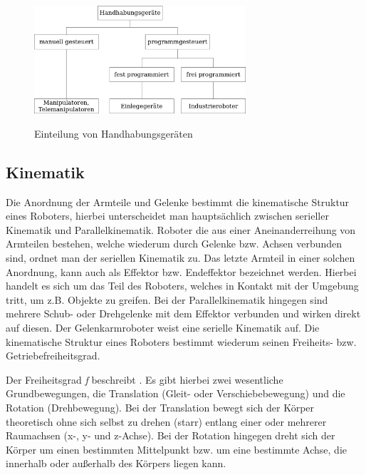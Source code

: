\documentclass[11pt,ngerman,parskip=half]{scrartcl}
\begin{document}
\begin{figure}[H]
  \centering
  \includegraphics[width=0.7\textwidth]{src/img/john2.png}
  \caption{Einteilung von Handhabungsgeräten}
  \label{img:john2}
  \parencite[][16]{weber_industrieroboter:_2017}
\end{figure}

\subsection{Kinematik}
\label{subsec:john_kinematik}
Die Anordnung der Armteile und Gelenke bestimmt die kinematische Struktur
eines Roboters, hierbei unterscheidet man hauptsächlich zwischen serieller
Kinematik und Parallelkinematik. Roboter die aus einer Aneinanderreihung von
Armteilen bestehen, welche wiederum durch Gelenke bzw. Achsen verbunden sind,
ordnet man der seriellen Kinematik zu. Das letzte Armteil in einer solchen
Anordnung, kann auch als Effektor bzw. Endeffektor bezeichnet werden. Hierbei
handelt es sich um das Teil des Roboters, welches in Kontakt mit der Umgebung
tritt, um z.B. Objekte zu greifen. Bei der Parallelkinematik hingegen sind
mehrere Schub- oder Drehgelenke mit dem Effektor verbunden und wirken direkt
auf diesen. Der Gelenkarmroboter weist eine serielle Kinematik auf. Die
kinematische Struktur eines Roboters bestimmt wiederum seinen Freiheits- bzw.
Getriebefreiheitsgrad. \parencite[vgl.][17--20]{weber_industrieroboter:_2017}

Der Freiheitsgrad \textit{f} beschreibt
. Es gibt hierbei zwei wesentliche
Grundbewegungen, die Translation (Gleit- oder Verschiebebewegung) und die
Rotation (Drehbewegung). Bei der Translation bewegt sich der Körper
theoretisch ohne sich selbst zu drehen (starr) entlang einer oder mehrerer
Raumachsen (x-, y- und z-Achse). Bei der Rotation hingegen dreht sich der
Körper um einen bestimmten Mittelpunkt bzw. um eine bestimmte Achse, die
innerhalb oder außerhalb des Körpers liegen kann.
\parencite[vgl.][53\psq]{schunke_funktionelle_2014}
\end{document}
